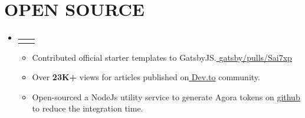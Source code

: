 \documentclass[a4paper,10pt]{article}
\makeatletter
\newcommand{\resumeItem}[1]{
  \item\small{
    {#1 \vspace{-2pt}}
  }
}
\newcommand{\resumeProjectHeading}[2]{
    \item
    \begin{tabular*}{1.001\textwidth}{l@{\extracolsep{\fill}}r}
      \small#1 & \textbf{\small #2}\\
    \end{tabular*}\vspace{-7pt}
}
\newcommand{\resumeSubHeadingListStart}{\begin{itemize}[leftmargin=0.0in, label={}]}
\newcommand{\resumeSubHeadingListEnd}{\end{itemize}}
\newcommand{\resumeItemListStart}{\begin{itemize}}
\newcommand{\resumeItemListEnd}{\end{itemize}\vspace{-5pt}}
\makeatother
\begin{document}
\section*{\normalsize\textbf{OPEN SOURCE}}
    \resumeSubHeadingListStart
      \resumeProjectHeading
          {}{}{}
          \resumeItemListStart
           \vspace{-16pt}
          \item{Contributed official starter templates to GatsbyJS.\href{https://github.com/gatsbyjs/gatsby/pulls?q=is:pr+author:Sai7xp+is:closed}{ \underline{gatsby/pulls/Sai7xp}} }
            \item{Over \textbf{23K+} views for articles published on\href{https://dev.to/sai7xp}{ \underline{Dev.to}} community.}
             \item Open-sourced a NodeJs utility service to generate Agora tokens on \href{https://github.com/Sai7xp/generate-agora-token-nodejs}{\underline{github}} to reduce the integration time.
          \resumeItemListEnd
    \resumeSubHeadingListEnd
\vspace{-10pt}
\end{document}
